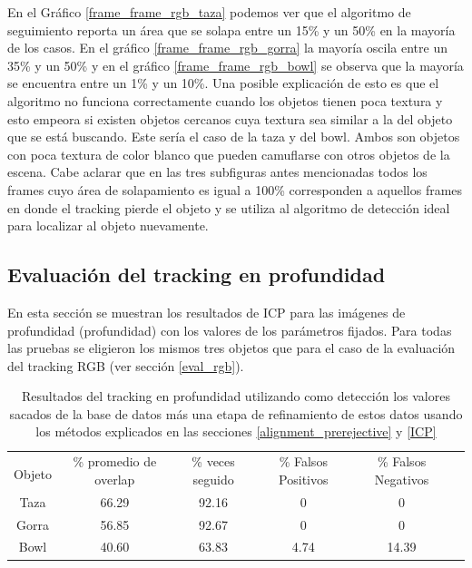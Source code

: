 En el Gráfico \ref{frame_frame_rgb_taza} podemos ver que el algoritmo de seguimiento reporta un área que se solapa entre un 15\% y un 50\% en la mayoría de los casos. En el gráfico \ref{frame_frame_rgb_gorra} la mayoría oscila entre un 35\% y un 50\% y en el gráfico \ref{frame_frame_rgb_bowl} se observa que la mayoría se encuentra entre un 1\% y un 10\%. Una posible explicación de esto es que el algoritmo no funciona correctamente cuando los objetos tienen poca textura y esto empeora si existen objetos cercanos cuya textura sea similar a la del objeto que se está buscando. Este sería el caso de la taza y del bowl. Ambos son objetos con poca textura de color blanco que pueden camuflarse con otros objetos de la escena.
Cabe aclarar que en las tres subfiguras antes mencionadas todos los frames cuyo área de solapamiento es igual a 100\% corresponden a aquellos frames en donde el tracking pierde el objeto y se utiliza al algoritmo de detección ideal para localizar al objeto nuevamente.

\subsection{Evaluación del tracking en profundidad}
En esta sección se muestran los resultados de ICP para las imágenes de profundidad (profundidad) con los valores de los parámetros fijados. Para todas las pruebas se eligieron los mismos tres objetos que para el caso de la evaluación del tracking RGB (ver sección \ref{eval_rgb}).

\begin{table}[h]
	\centering
    \begin{tabular}{|c|c|c|c|c|c|}
    \hline
    & \multirow{2}{2.4cm}{\% promedio de overlap} & \multirow{2}{2cm}{\% veces seguido} & \multirow{2}{1.6cm}{\% Falsos Positivos} & \multirow{2}{1.6cm}{\% Falsos Negativos}\\
	Objeto & & & &\\
    \hline
    Taza   & 66.29      & 92.16      & 0      & 0     \\
    \hline
    Gorra  & 56.85      & 92.67      & 0      & 0     \\
    \hline
    Bowl   & 40.60      & 63.83      & 4.74   & 14.39 \\
    \hline
    \end{tabular}
\caption{Resultados del tracking en profundidad utilizando como detección los valores sacados de la base de datos más una etapa de refinamiento de estos datos usando los métodos explicados en las secciones \ref{alignment_prerejective} y \ref{ICP}}
\label{tabla_d}
\end{table}

